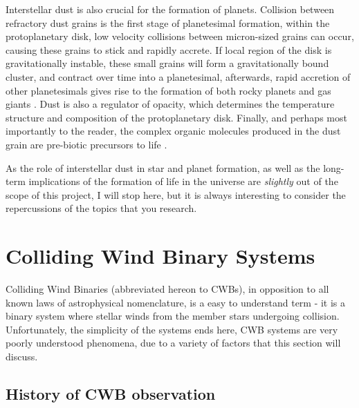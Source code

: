 Interstellar dust is also crucial for the formation of planets.
Collision between refractory dust grains is the first stage of planetesimal formation, within the protoplanetary disk, low velocity collisions between micron-sized grains can occur, causing these grains to stick and rapidly accrete.
If local region of the disk is gravitationally instable, these small grains will form a gravitationally bound cluster, and contract over time into a planetesimal, afterwards, rapid accretion of other planetesimals gives rise to the formation of both rocky planets and gas giants
\parencite{apaiProtoplanetaryDustAstrophysical2010}.
Dust is also a regulator of opacity, which determines the temperature structure and composition of the protoplanetary disk.
Finally, and perhaps most importantly to the reader, the complex organic molecules produced in the dust grain are pre-biotic precursors to life
\parencite{birnstielDustEvolutionFormation2016}.

As the role of interstellar dust in star and planet formation, as well as the long-term implications of the formation of life in the universe are \textit{slightly} out of the scope of this project, I will stop here, but it is always interesting to consider the repercussions of the topics that you research.

\section{Colliding Wind Binary Systems}
\label{sec:cwb}

Colliding Wind Binaries (abbreviated hereon to CWBs), in opposition to all known laws of astrophysical nomenclature, is a easy to understand term - it is a binary system where stellar winds from the member stars undergoing collision.
Unfortunately, the simplicity of the systems ends here, CWB systems are very poorly understood phenomena, due to a variety of factors that this section will discuss.

\subsection{History of CWB observation}


